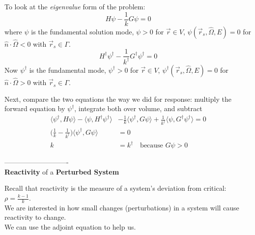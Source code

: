 \documentclass[12pt]{article}
\newcommand{\rvec}{\ensuremath{\vec{r}}}
\newcommand{\vOmega}{\ensuremath{\hat{\Omega}}}
\begin{document}
To look at the \textit{eigenvalue} form of the problem:
\[
H\psi - \frac{1}{k}G\psi = 0
\]
where $\psi$ is the fundamental solution mode, $\psi > 0$ for $\rvec \in V$, $\psi(\vec{r}_s, \vOmega, E) = 0$ for $\hat{n} \cdot \vOmega < 0$ with $\vec{r}_s \in \Gamma$.  
\[
H^{\dagger}\psi^{\dagger} - \frac{1}{k^{\dagger}}G^{\dagger}\psi^{\dagger} = 0
\]
Now $\psi^{\dagger}$ is the fundamental mode, $\psi^{\dagger} > 0$ for $\rvec \in V$, $\psi^{\dagger}(\vec{r}_s, \vOmega, E) = 0$ for $\hat{n} \cdot \vOmega > 0$ with $\vec{r}_s \in \Gamma$.  

Next, compare the two equations the way we did for response: multiply the forward equation by $\psi^{\dagger}$, integrate both over volume, and subtract
\begin{align*}
\langle\psi^{\dagger}, H\psi\rangle - \langle\psi, H^{\dagger} \psi^{\dagger}\rangle &- \frac{1}{k}\langle\psi^{\dagger}, G\psi\rangle + \frac{1}{k^{\dagger}}\langle\psi, G^{\dagger}\psi^{\dagger}\rangle = 0\\
\bigl(\frac{1}{k} - \frac{1}{k^{\dagger}} \bigr)\langle\psi^{\dagger}, G\psi\rangle  &= 0 \\
k &= k^{\dagger} \quad \text{because }G\psi > 0
\end{align*}

\clearpage----------------------------\\
\textbf{Reactivity} of a \textbf{Perturbed System}

Recall that reactivity is the measure of a system's deviation from critical: $\rho = \frac{k-1}{k}$.\\
We are interested in how small changes (perturbations) in a system will cause reactivity to change.\\
We can use the adjoint equation to help us.
\end{document}
